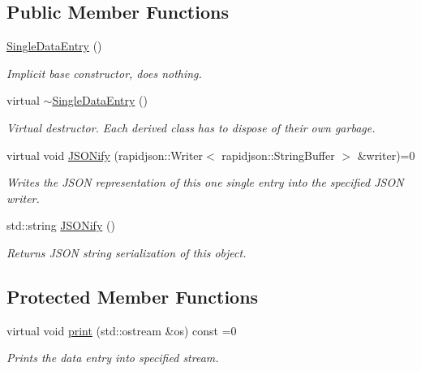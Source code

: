 \subsection*{Public Member Functions}
\begin{DoxyCompactItemize}
\item 
\hyperlink{classSingleDataEntry_a64f6763312181cd57157bafe94f9a4ee}{Single\+Data\+Entry} ()
\begin{DoxyCompactList}\small\item\em Implicit base constructor, does nothing. \end{DoxyCompactList}\item 
virtual \hyperlink{classSingleDataEntry_a0b6b6ebca677d8cd87062db2f354f364}{$\sim$\+Single\+Data\+Entry} ()
\begin{DoxyCompactList}\small\item\em Virtual destructor. Each derived class has to dispose of their own garbage. \end{DoxyCompactList}\item 
virtual void \hyperlink{classSingleDataEntry_a64fb67b2f11f2fe64394059f1b29a248}{J\+S\+O\+Nify} (rapidjson\+::\+Writer$<$ rapidjson\+::\+String\+Buffer $>$ \&writer)=0
\begin{DoxyCompactList}\small\item\em Writes the J\+S\+O\+N representation of this one single entry into the specified J\+S\+O\+N writer. \end{DoxyCompactList}\item 
std\+::string \hyperlink{classSingleDataEntry_a9e48725016d6fbd6bd674d5b299dbb12}{J\+S\+O\+Nify} ()
\begin{DoxyCompactList}\small\item\em Returns J\+S\+O\+N string serialization of this object. \end{DoxyCompactList}\end{DoxyCompactItemize}
\subsection*{Protected Member Functions}
\begin{DoxyCompactItemize}
\item 
virtual void \hyperlink{classSingleDataEntry_a20d7a043eaf55d45c6e079cc9baee49c}{print} (std\+::ostream \&os) const =0
\begin{DoxyCompactList}\small\item\em Prints the data entry into specified stream. \end{DoxyCompactList}\end{DoxyCompactItemize}
